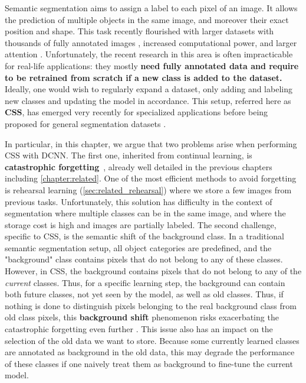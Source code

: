 Semantic segmentation aims to assign a label to each pixel of an image.
It allows the prediction of multiple objects in the same image, and moreover their exact position
and shape. This task recently flourished \citep{tao2020HRNet,zhang2020resnest,chen2018ZPSA} with
larger datasets with thousands of fully annotated images
\citep{zhou2017adedataset,neuhold2017mapillary}, increased computational power, and larger attention
\citep{wang2020axialdeeplab}. Unfortunately, the recent research in this area is often impracticable
for real-life applications: they mostly \textbf{need fully annotated data and require to be retrained from
    scratch if a new class is added to the dataset.} Ideally, one would wish to regularly expand a
dataset, only adding and labeling new classes and updating the model in accordance. This setup,
referred here as \textbf{\acf{CSS}}, has emerged very recently for specialized
applications
\citep{ozdemir2018learnthenewkeeptheold,ozdemir2019segmentationanotomical,tasar19incrementsegmentationremotesensing}
before being proposed for general segmentation datasets
\citep{michieli2019ilt,cermelli2020modelingthebackground}.


In particular, in this chapter, we argue that two problems arise when performing \ac{CSS} with
\acs{DCNN}. The first one, inherited from continual learning, is \textbf{catastrophic
    forgetting}~\citep{robins1995catastrophicforgetting}, already well detailed in the previous chapters
including \autoref{chapter:related}. One of the most efficient methods to avoid forgetting is rehearsal
learning (\autoref{sec:related_rehearsal}) where we store a few images from previous tasks.
Unfortunately, this solution has difficulty in the context of segmentation where multiple classes
can be in the same image, and where the storage cost is high and images are partially labeled. The
second challenge, specific to \ac{CSS}, is the semantic shift of the background class. In a
traditional semantic segmentation setup, all object categories are predefined, and the "background"
class contains pixels that do not belong to any of these classes. However, in \ac{CSS}, the
background contains pixels that do not belong to any of the \textit{current} classes. Thus, for a
specific learning step, the background can contain both future classes, not yet seen by the model,
as well as old classes. Thus, if nothing is done to distinguish pixels belonging to the real
background class from old class pixels, this \textbf{background shift} phenomenon risks exacerbating
the catastrophic forgetting even further \citep{cermelli2020modelingthebackground}. This issue also
has an impact on the selection of the old data we want to store. Because some currently learned
classes are annotated as background in the old data, this may degrade the performance of these
classes if one naively treat them as background to fine-tune the current model.

